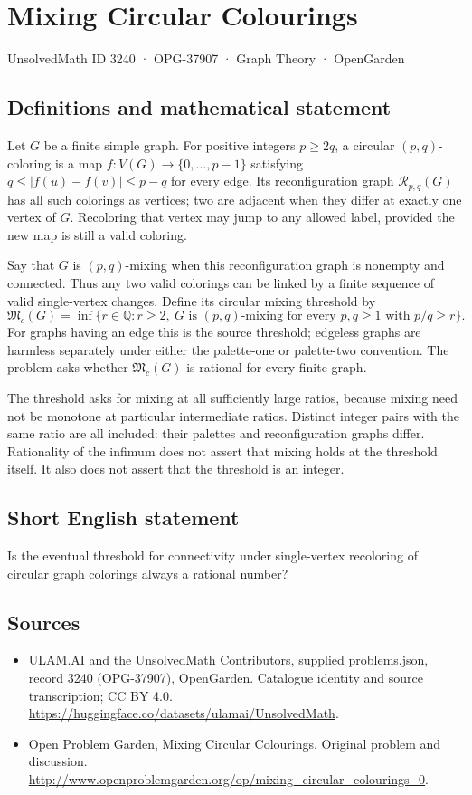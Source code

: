 \documentclass[11pt,a4paper]{article}
\begin{document}
\section*{Mixing Circular Colourings}\label{3240}
{\small UnsolvedMath ID 3240 · OPG-37907 · Graph Theory · OpenGarden}
\subsection{Definitions and mathematical statement}
Let $G$ be a finite simple graph. For positive integers $p\ge2q$, a circular $(p,q)$-coloring is a map $f:V(G)\to\{0,\ldots,p-1\}$ satisfying $q\le|f(u)-f(v)|\le p-q$ for every edge. Its reconfiguration graph $\mathcal R_{p,q}(G)$ has all such colorings as vertices; two are adjacent when they differ at exactly one vertex of $G$. Recoloring that vertex may jump to any allowed label, provided the new map is still a valid coloring.

Say that $G$ is $(p,q)$-mixing when this reconfiguration graph is nonempty and connected. Thus any two valid colorings can be linked by a finite sequence of valid single-vertex changes. Define its circular mixing threshold by
\[
 \mathfrak M_c(G)=\inf\{r\in\mathbb Q:r\ge2,\ G\text{ is }(p,q)\text{-mixing}
          \text{ for every }p,q\ge1\text{ with }p/q\ge r\}.
\]
For graphs having an edge this is the source threshold; edgeless graphs are harmless separately under either the palette-one or palette-two convention. The problem asks whether $\mathfrak M_c(G)$ is rational for every finite graph.

The threshold asks for mixing at all sufficiently large ratios, because mixing need not be monotone at particular intermediate ratios. Distinct integer pairs with the same ratio are all included: their palettes and reconfiguration graphs differ. Rationality of the infimum does not assert that mixing holds at the threshold itself. It also does not assert that the threshold is an integer.
\subsection{Short English statement}
Is the eventual threshold for connectivity under single-vertex recoloring of circular graph colorings always a rational number?
\subsection{Sources}
\begin{itemize}
\item[S1] ULAM.AI and the UnsolvedMath Contributors, supplied problems.json, record 3240 (OPG-37907), OpenGarden. Catalogue identity and source transcription; CC BY 4.0.
\url{https://huggingface.co/datasets/ulamai/UnsolvedMath}.
\item[S2] Open Problem Garden, Mixing Circular Colourings. Original problem and discussion.
\url{http://www.openproblemgarden.org/op/mixing_circular_colourings_0}.
\end{itemize}
\end{document}
